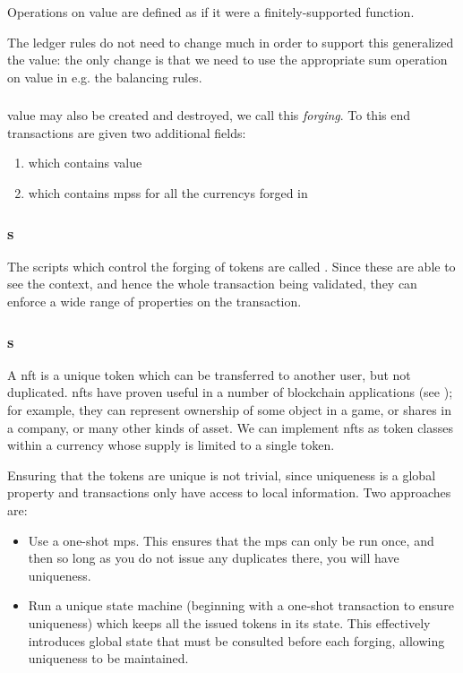Operations on \gls{value} are defined as if it were a finitely-supported function.

The ledger rules do not need to change much in order to support this generalized the \gls{value}: the only change is that we need to use the appropriate sum operation on \gls{value} in e.g. the balancing rules.

\subsubsection{}
\label{sec:forging}
\Gls{value} may also be created and destroyed, we call this \emph{\gls{forging}}.
To this end transactions are given two additional fields:
\begin{enumerate}
\item {} which contains \gls{value}
\item {} which contains \glspl{mps} for all the \glspl{currency} forged in 
\end{enumerate}

\subsubsection{s}
The \glspl{script} which control the forging of \glspl{token} are called .
Since these are able to see the \gls{context}, and hence the whole transaction being validated, they can enforce a wide range of properties on the transaction.

\subsubsection{s}
A \gls{nft} is a unique \gls{token} which can be transferred to another user, but not duplicated.
\Glspl{nft} have proven useful in a number of blockchain applications (see \textcite{ERC-721}); for example, they can represent ownership of some object in a game, or shares in a company, or many other kinds of asset.
We can implement \glspl{nft} as token classes within a \gls{currency} whose supply is limited to a single \gls{token}.

Ensuring that the tokens are unique is not trivial, since uniqueness is a global property and transactions only have access to local information.
Two approaches are:
\begin{itemize}
\item
  Use a \gls{one-shot} \gls{mps}.
  This ensures that the \gls{mps} can only be run once, and then so long as you do not issue any duplicates there, you will have uniqueness.
\item
  Run a unique state machine (beginning with a \gls{one-shot} transaction to ensure uniqueness) which keeps all the issued tokens in its state.
  This effectively introduces global state that must be consulted before each forging, allowing uniqueness to be maintained.
\end{itemize}

